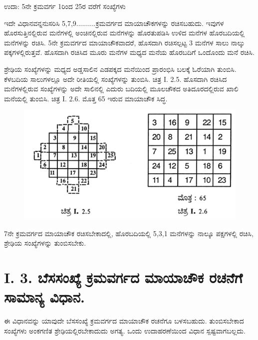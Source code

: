 ಉದಾ: 5ನೇ ಕ್ರಮವರ್ಗ 1ರಿಂದ 25ರ ವರೆಗೆ ಸಂಖ್ಯೆಗಳು

ಇದೇ ವಿಧಾನವನ್ನನುಸರಿಸಿ 5,7,9..........ಕ್ರಮವರ್ಗದ ಮಾಯಾಚೌಕಗಳನ್ನು ರಚಿಸಬಹುದು. ಇವುಗಳ ಹೊರಸುತ್ತಿನಲ್ಲಿರುವ ಮನೆಗಳಲ್ಲಿ ಅಂಚಿನಲ್ಲಿರುವ ಮನೆಗಳನ್ನು ಹೊರತುಪಡಿಸಿ ಉಳಿದ ಮನೆಗಳ ಹೊರಬದಿಯಲ್ಲಿ ಮನೆಗಳನ್ನು ರಚಿಸಿ. 5ನೇ ಕ್ರಮವರ್ಗದ ಮಾಯಾಚೌಕವಾದರೆ, ಹೊಸದಾಗಿ ರಚಿಸಲ್ಪಟ್ಟ 3 ಮನೆಗಳ ಸಾಲು ನಾಲ್ಕು ಪಕ್ಕಗಳಲ್ಲಿರುತ್ತವೆ. ಹೊಸ\-ದಾಗಿ ರಚಿಸಿದ ಮೂರು ಮನೆಗಳ ಮಧ್ಯದ ಮನೆಯ ಹೊರಬದಿಗೆ ಒಂದೊಂದು ಮನೆ ರಚಿಸಿ.

ಶ್ರೇಢಿಯ ಸಂಖ್ಯೆಗಳನ್ನು ಮಧ್ಯದ ಅಡ್ಡಸಾಲಿನ ಎಡಪಕ್ಕದ ಮನೆಯಿಂದ ಪ್ರಾರಂಭಿಸಿ ಬಲಕ್ಕೆ ಓರೆಯಾಗಿ ತುಂಬಿಸಿ. ಕೆಳಬದಿಯ ಸಾಲುಗಳಲ್ಲೂ ಅದೇ ರೀತಿಯಲ್ಲಿ ಸಂಖ್ಯೆಗಳನ್ನು ತುಂಬಿಸಿ. ಚಿತ್ರ I. 2.5. ಹೊಸದಾಗಿ ರಚಿಸಿದ ಮನೆಗಳಲ್ಲಿರುವ ಸಂಖ್ಯೆಗಳನ್ನು ಅದೇ ಸಾಲಿನಲ್ಲಿ ಎದುರು ಬದಿಯಲ್ಲಿ ಮೂಲಚೌಕದ ಅತಿದೂರದಲ್ಲಿರುವ ಖಾಲಿ ಮನೆಯಲ್ಲಿ ತುಂಬಿಸಿ. ಚಿತ್ರ I. 2.6. ಮೊತ್ತ 65 ಇರುವ ಮಾಯಾಚೌಕ ಸಿದ್ಧ.
\begin{figure}[h]
\includegraphics{src/figures/chap3/fig3.5.jpg}
\end{figure}

7ನೇ ಕ್ರಮವರ್ಗದ ಮಾಯಾಚೌಕ ರಚಿಸಬೇಕಾದಲ್ಲಿ, ಹೊರಬದಿಯಲ್ಲಿ 5,3,1 ಮನೆ\-ಗಳನ್ನು ನಾಲ್ಕೂ ಪಕ್ಷಗಳಲ್ಲಿ ರಚಿಸಿ, ಶ್ರೇಢಿಯ ಸಂಖ್ಯೆಗಳನ್ನು ತುಂಬಿಸಬೇಕು.

\newpage

\section*{I. 3. ಬೆಸಸಂಖ್ಯೆ  ಕ್ರಮವರ್ಗದ ಮಾಯಾಚೌಕ ರಚನೆಗೆ ಸಾಮಾನ್ಯ ವಿಧಾನ.}

ಈ ವಿಧಾನವನ್ನು ಯಾವುದೇ ಬೆಸಸಂಖ್ಯೆ ಕ್ರಮವರ್ಗದ ಮಾಯಾಚೌಕ ರಚನೆಗೂ ಬಳಸ\-ಬಹುದು. ತುಂಬಿಸಬೇಕಾದ ಸಂಖ್ಯೆಗಳು ಅಂಕಗಣಿತ ಶ್ರೇಢಿಯಲ್ಲಿರಬೇಕಾದುದು ಅಗತ್ಯ. ಒಂದು ಉದಾಹರಣೆಯಿಂದ ವಿಧಾನ ಸ್ಪಷ್ಟವಾಗಬಲ್ಲದು.

